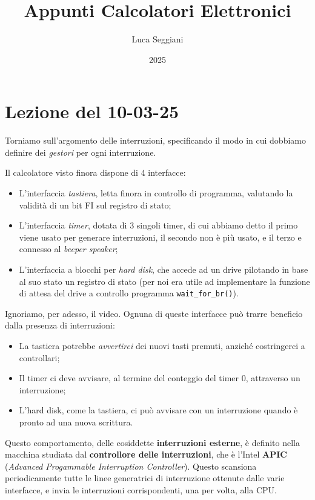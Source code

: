 \documentclass[a4paper,11pt]{article}
\title{Appunti Calcolatori Elettronici}
\author{Luca Seggiani}
\date{2025}
\begin{document}
\section{Lezione del 10-03-25}

\thispagestyle{empty}
\pagestyle{fancy}

Torniamo sull'argomento delle interruzioni, specificando il modo in cui dobbiamo definire dei \textit{gestori} per ogni interruzione.

Il calcolatore visto finora dispone di 4 interfacce: \begin{itemize}
	\item L'interfaccia \textit{tastiera}, letta finora in controllo di programma, valutando la validità di un bit FI sul registro di stato;
	\item L'interfaccia \textit{timer}, dotata di 3 singoli timer, di cui abbiamo detto il primo viene usato per generare interruzioni, il secondo non è più usato, e il terzo e connesso al \textit{beeper speaker};
	\item L'interfaccia a blocchi per \textit{hard disk}, che accede ad un drive pilotando in base al suo stato un registro di stato (per noi era utile ad implementare la funzione di attesa del drive a controllo programma \lstinline|wait_for_br()|).
\end{itemize} 

Ignoriamo, per adesso, il video.
Ognuna di queste interfacce può trarre beneficio dalla presenza di interruzioni:
\begin{itemize}
	\item La tastiera potrebbe \textit{avvertirci} dei nuovi tasti premuti, anziché costringerci a controllari;
	\item Il timer ci deve avvisare, al termine del conteggio del timer 0, attraverso un interruzione;
	\item L'hard disk, come la tastiera, ci può avvisare con un interruzione quando è pronto ad una nuova scrittura.
\end{itemize}

Questo comportamento, delle cosiddette \textbf{interruzioni esterne}, è definito nella macchina studiata dal \textbf{controllore delle interruzioni}, che è l'Intel \textbf{APIC} (\textit{Advanced Progammable Interruption Controller}).
Questo scansiona periodicamente tutte le linee generatrici di interruzione ottenute dalle varie interfacce, e invia le interruzioni corrispondenti, una per volta, alla CPU. 
\end{document}
